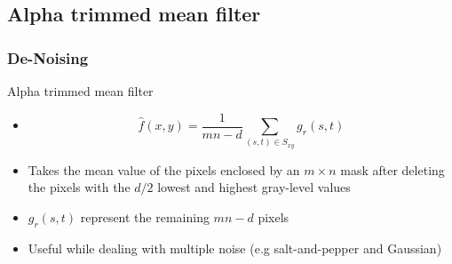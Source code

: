 \documentclass{beamer}
\begin{document}
\subsection{Alpha trimmed mean filter}
\begin{frame}
\frametitle{De-Noising}
\begin{block}{Alpha trimmed mean filter}
\begin{itemize}
	\item[] $$\hat{f}(x,y) = \frac{1}{mn-d} \sum\limits_{(s,t)\in S_{xy}} g_{r}(s,t)$$
	\item Takes the mean value of the pixels enclosed by an $m \times n$ mask after deleting the pixels with the $d/2$ lowest and highest gray-level values
	\item $g_{r}(s,t)$ represent the remaining $mn-d$ pixels
	\item Useful while dealing with multiple noise (e.g salt-and-pepper and Gaussian) 	
\end{itemize}
\end{block}
\end{frame}
\end{document}
